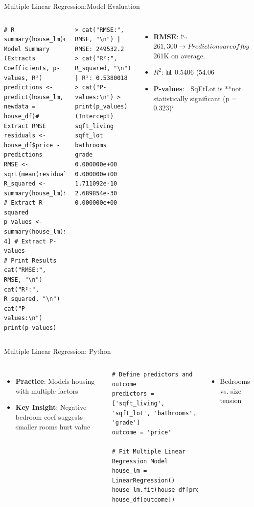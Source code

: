 \documentclass{beamer}
\begin{document}
\begin{frame}[fragile]{Multiple Linear Regression:Model Evaluation}
	\begin{columns}
		\begin{lstlisting}
# R
summary(house_lm)# Model Summary (Extracts Coefficients, p-values, R²)
predictions <- predict(house_lm, newdata = house_df)# Extract RMSE
residuals <- house_df$price - predictions
RMSE <- sqrt(mean(residuals^2))
R_squared <- summary(house_lm)$r.squared # Extract R-squared
p_values <- summary(house_lm)$coefficients[, 4] # Extract P-values
# Print Results
cat("RMSE:", RMSE, "\n")
cat("R²:", R_squared, "\n")
cat("P-values:\n")
print(p_values)
		\end{lstlisting}
		\begin{lstlisting}
> cat("RMSE:", RMSE, "\n") | RMSE: 249532.2 
> cat("R²:", R_squared, "\n") | R²: 0.5380018 
> cat("P-values:\n") > print(p_values)
(Intercept)  sqft_living     sqft_lot    bathrooms        grade 
0.000000e+00 0.000000e+00 1.711092e-10 2.689854e-30 0.000000e+00 
		\end{lstlisting}
		\begin{itemize}
			\item \textbf{RMSE}: 📉 $261,300 → Predictions are off by ~$261K on average.
			\item \textbf{$R^2$}: 📊 0.5406 (54.06%
			\item \textbf{P-values}: 🧪 SqFtLot is **not statistically significant (p = 0.323)`
		\end{itemize}
	\end{columns}
\end{frame}

	
	\begin{frame}[fragile]{Multiple Linear Regression: Python}
		\lstset{language=Python}
		\begin{columns}
			\column{0.6\textwidth}
			\begin{itemize}
				\item \textbf{Practice}: Models housing with multiple factors
				\item \textbf{Key Insight}: Negative bedroom coef suggests smaller rooms hurt value
			\end{itemize}
			\begin{lstlisting}
# Define predictors and outcome
predictors = ['sqft_living', 'sqft_lot', 'bathrooms', 'grade']
outcome = 'price'

# Fit Multiple Linear Regression Model
house_lm = LinearRegression()
house_lm.fit(house_df[predictors], house_df[outcome])

			\end{lstlisting}
			\column{0.4\textwidth}
			\begin{itemize}
				\item Bedrooms vs. size tension
			\end{itemize}
		\end{columns}
	\end{frame}
	
\end{document}
